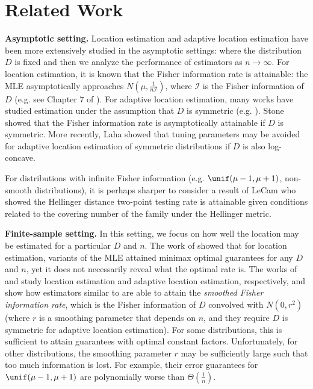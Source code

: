 \section{Related Work}
\textbf{Asymptotic setting. } Location estimation and adaptive location estimation have been more extensively studied in the asymptotic settings: where the distribution $D$ is fixed and then we analyze the performance of estimators as $n \rightarrow \infty$. For location estimation, it is known that the Fisher information rate is attainable: the MLE asymptotically approaches $N(\mu,\tfrac{1}{n\mathcal{I}})$, where $\mathcal{I}$ is the Fisher information of $D$ (e.g. see Chapter 7 of \cite{van2000asymptotic}). For adaptive location estimation, many works have studied estimation under the assumption that $D$ is symmetric (e.g. \cite{stein1956efficient,van1970efficiency,stone1975adaptive,sacks1975asymptotically,beran1978efficient,dalalyan2006penalized}). Stone \cite{stone1975adaptive} showed that the Fisher information rate is asymptotically attainable if $D$ is symmetric.  More recently, Laha \cite{laha2019location} showed that tuning parameters may be avoided for adaptive location estimation of symmetric distributions if $D$ is also log-concave. 

For distributions with infinite Fisher information (e.g. $\unif(\mu - 1, \mu + 1)$, non-smooth distributions), it is perhaps sharper to consider a result of LeCam \cite{lecam1973convergence} who showed the Hellinger distance two-point testing rate is attainable given conditions related to the covering number of the family under the Hellinger metric.


\textbf{Finite-sample setting. } In this setting, we focus on how well the location may be estimated for a particular $D$ and $n$. The work of \cite{gupta2024minimax} showed that for location estimation, variants of the MLE attained minimax optimal guarantees for any $D$ and $n$, yet it does not necessarily reveal what the optimal rate is. The works of \cite{gupta2022finite} and \cite{gupta2023finite} study location estimation and adaptive location estimation, respectively, and show how estimators similar to \cite{stone1975adaptive} are able to attain the \textit{smoothed Fisher information rate}, which is the Fisher information of $D$ convolved with $N(0,r^2)$ (where $r$ is a smoothing parameter that depends on $n$, and they require $D$ is symmetric for adaptive location estimation). For some distributions, this is sufficient to attain guarantees with optimal constant factors. Unfortunately, for other distributions, the smoothing parameter $r$ may be sufficiently large such that too much information is lost. For example, their error guarantees for $\unif(\mu-1,\mu+1)$ are polynomially worse than $\Theta(\frac{1}{n})$.

